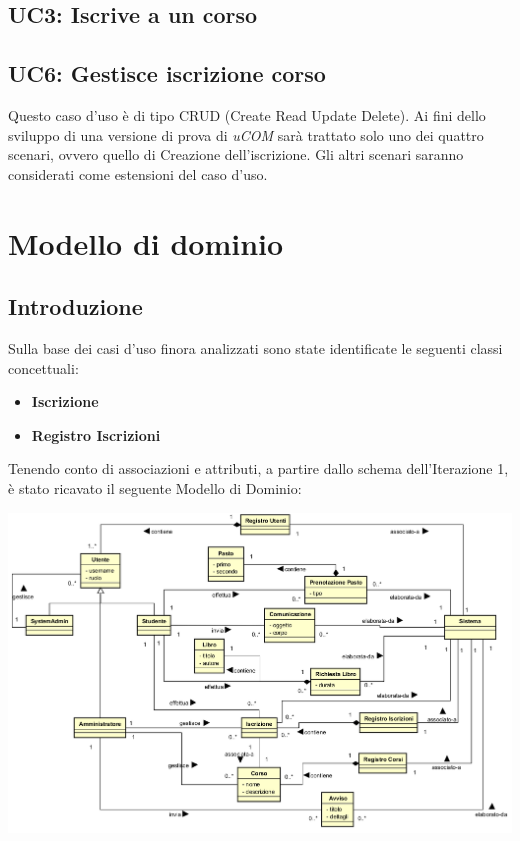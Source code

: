 \documentclass[12pt]{report}
\begin{document}
	\subsection{UC3: Iscrive a un corso}

		

	\newpage

	\subsection{UC6: Gestisce iscrizione corso}

	Questo caso d'uso è di tipo CRUD (Create Read Update Delete). Ai fini dello sviluppo di una versione di prova di \textit{uCOM} sarà trattato solo uno dei quattro scenari, ovvero quello di Creazione dell'iscrizione. Gli altri scenari saranno considerati come estensioni del caso d'uso.

		
	
	\newpage
	
	
	\section{Modello di dominio}
	
	\subsection{Introduzione}
	
	Sulla base dei casi d'uso finora analizzati sono state identificate le seguenti classi concettuali:
	\begin{itemize}
		\item \textbf{Iscrizione}
		\item \textbf{Registro Iscrizioni}
	\end{itemize}

	Tenendo conto di associazioni e attributi, a partire dallo schema dell'Iterazione 1, è stato ricavato il seguente Modello di Dominio:
	
	\begin{center}	
	\includegraphics[scale=0.7]{./images/domain-I4.png}
	\end{center}
	
\end{document}
